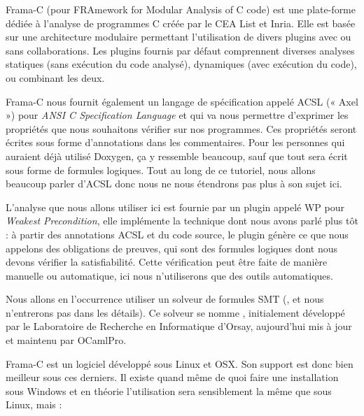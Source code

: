 

\begin{center}
\end{center}




Frama-C (pour FRAmework for Modular Analysis of C code) est une plate-forme
 dédiée à l'analyse de programmes C créée par le CEA List et Inria. Elle est 
 basée sur une architecture modulaire permettant l'utilisation de divers 
 plugins avec ou sans collaborations. Les plugins fournis par défaut 
 comprennent diverses analyses statiques (sans exécution du code analysé), 
 dynamiques (avec exécution du code), ou combinant les deux.



Frama-C nous fournit également un langage de spécification appelé ACSL (« Axel »)
pour \textit{ANSI C Specification Language} et qui va nous permettre d'exprimer les 
propriétés que nous souhaitons vérifier sur nos programmes. Ces propriétés seront
écrites sous forme d'annotations dans les commentaires. Pour les personnes qui 
auraient déjà utilisé Doxygen, ça y ressemble beaucoup, sauf que tout sera 
écrit sous forme de formules logiques. Tout au long de ce tutoriel, nous allons 
beaucoup parler d'ACSL donc nous ne nous étendrons pas plus à son sujet ici.



L'analyse que nous allons utiliser ici est fournie par un plugin appelé WP pour
\textit{Weakest Precondition}, elle implémente la technique dont nous avons parlé plus tôt : 
à partir des annotations ACSL et du code source, le plugin génère ce que nous 
appelons des obligations de preuves, qui sont des formules logiques dont nous
devons vérifier la satisfiabilité. Cette vérification peut être faite de manière 
manuelle ou automatique, ici nous n'utiliserons que des outils automatiques.



Nous allons en l'occurrence utiliser un solveur de formules SMT
(,
et nous n'entrerons pas dans les détails). Ce solveur se nomme 
, initialement développé par le Laboratoire
de Recherche en Informatique d'Orsay, aujourd'hui mis à jour et maintenu par
OCamlPro.





Frama-C est un logiciel développé sous Linux et OSX. Son support est donc bien
meilleur sous ces derniers. Il existe quand même de quoi faire une installation 
sous Windows et en théorie l'utilisation sera sensiblement la même que sous 
Linux, mais :



